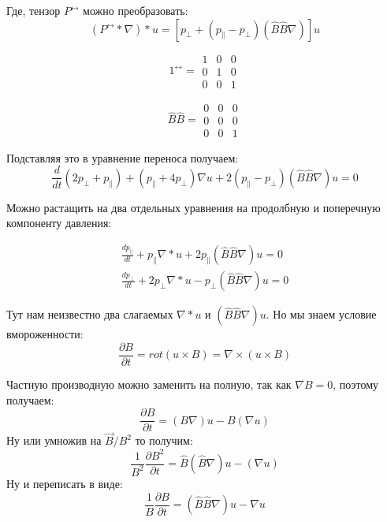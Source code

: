 \documentclass[10pt, a4paper]{article}
\begin{document}
Где, тензор $P^{\leftrightarrow}$  можно преобразовать:
\begin{equation}
	(P^{\leftrightarrow}*\nabla)*u=[p_{\perp} +(p_{\parallel}-p_{\perp})(\hat B \hat B \nabla)]u
\end{equation}

\begin{equation}
	1^{\leftrightarrow}=
	\begin{matrix}
		1 & 0 & 0\\
		0 & 1 & 0 \\
		0 & 0 & 1
	\end{matrix}
\end{equation}

\begin{equation}
	\hat B \hat B=
	\begin{matrix}
		0 & 0 & 0\\
		0 & 0 & 0 \\
		0 & 0 & 1
	\end{matrix}
\end{equation}

Подставляя это в уравнение переноса получаем:
\begin{equation}
	\frac{d}{dt} (2p_{\perp}+p_{\parallel})+(p_{\parallel}+4p_{\perp})\nabla u +2(p_{\parallel}-p_{\perp})(\hat B \hat B \nabla)u=0
\end{equation}

Можно растащить на два отдельных уравнения на продолбную и поперечную компоненту давления:

\begin{align*}
	\frac{d p_{\parallel}}{dt} + p_{\parallel} \nabla*u + 2p_{\parallel}(\hat B \hat B \nabla)u=0 \\
	\frac{d p_{\perp}}{dt} + 2p_{\perp} \nabla*u - p_{\perp}(\hat B \hat B \nabla)u=0
\end{align*}

Тут нам неизвестно два слагаемых $\nabla*u$ и $(\hat B \hat B \nabla)u$. Но мы знаем условие вмороженности:
\begin{equation}
	\frac{\partial B}{\partial t} = rot(u\times B)= \nabla \times (u \times B)
\end{equation}

Частную производную можно заменить на полную, так как $\nabla B=0$, поэтому получаем:
\begin{equation}
	\frac{\partial B}{\partial t} = (B \nabla)u-B(\nabla u)
\end{equation}
Ну или умножив на $\vec B/B^2$ то получим:
\begin{equation}
	\frac{1}{B^2} \frac{\partial B^2}{\partial t} =\hat B (\hat B \nabla)u-(\nabla u)
\end{equation}
Ну и переписать в виде:
\begin{equation}
	\frac{1}{B} \frac{\partial B}{\partial t} =(\hat B \hat B \nabla)u-\nabla u
\end{equation}
\end{document}
